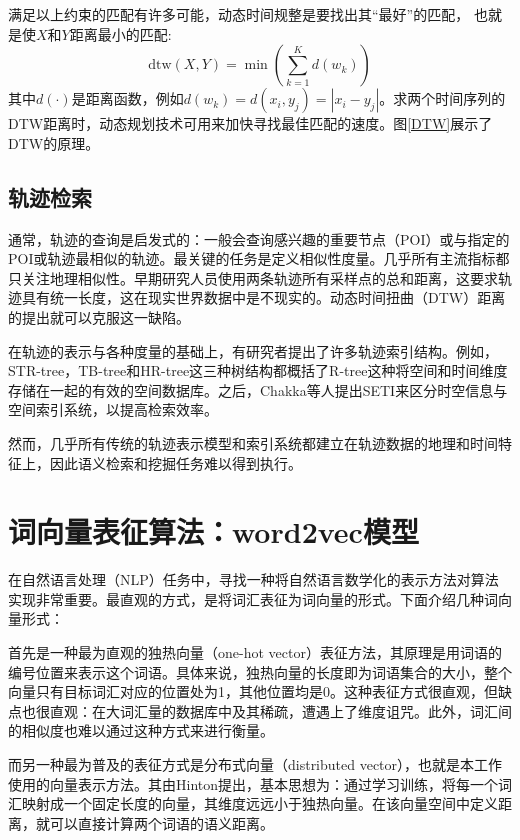 
满足以上约束的匹配有许多可能，动态时间规整是要找出其“最好”的匹配， 也就是使$X$和$Y$距离最小的匹配:
\begin{equation}
\text{dtw}( X , Y ) = \min \left( \sum _ { k = 1 } ^ { K } d \left( w _ { k } \right) \right)
\end{equation}
其中$d(\cdot)$是距离函数，例如$d \left( w _ { k } \right) = d \left( x _ { i } , y _ { j } \right) = \left| x _ { i } - y _ { j } \right|$。求两个时间序列的DTW距离时，动态规划技术可用来加快寻找最佳匹配的速度。图\ref{DTW}展示了DTW的原理。


\subsection{轨迹检索}
通常，轨迹的查询是启发式的：一般会查询感兴趣的重要节点（POI）或与指定的POI或轨迹最相似的轨迹。最关键的任务是定义相似性度量。几乎所有主流指标都只关注地理相似性。早期研究人员使用两条轨迹所有采样点的总和距离，这要求轨迹具有统一长度，这在现实世界数据中是不现实的。动态时间扭曲（DTW）距离的提出就可以克服这一缺陷。

在轨迹的表示与各种度量的基础上，有研究者提出了许多轨迹索引结构。例如，STR-tree，TB-tree和HR-tree这三种树结构都概括了R-tree这种将空间和时间维度存储在一起的有效的空间数据库。之后，Chakka等人提出SETI来区分时空信息与空间索引系统，以提高检索效率。

然而，几乎所有传统的轨迹表示模型和索引系统都建立在轨迹数据的地理和时间特征上，因此语义检索和挖掘任务难以得到执行。


\section{词向量表征算法：word2vec模型}
在自然语言处理（NLP）任务中，寻找一种将自然语言数学化的表示方法对算法实现非常重要。最直观的方式，是将词汇表征为词向量的形式。下面介绍几种词向量形式：

首先是一种最为直观的独热向量（one-hot vector）表征方法，其原理是用词语的编号位置来表示这个词语。具体来说，独热向量的长度即为词语集合的大小，整个向量只有目标词汇对应的位置处为1，其他位置均是0。这种表征方式很直观，但缺点也很直观：在大词汇量的数据库中及其稀疏，遭遇上了维度诅咒。此外，词汇间的相似度也难以通过这种方式来进行衡量。

而另一种最为普及的表征方式是分布式向量（distributed vector），也就是本工作使用的向量表示方法。其由Hinton提出，基本思想为：通过学习训练，将每一个词汇映射成一个固定长度的向量，其维度远远小于独热向量。在该向量空间中定义距离，就可以直接计算两个词语的语义距离。

